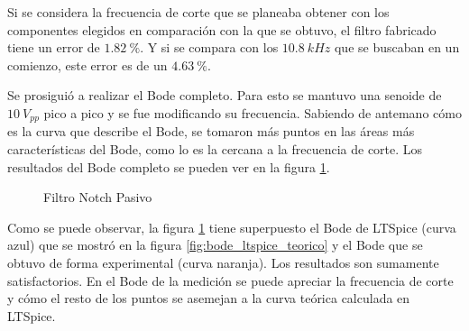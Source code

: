 Si se considera la frecuencia de corte que se planeaba obtener con los componentes elegidos en comparación con la que se obtuvo, el filtro fabricado tiene un error de $1.82 \ \%$. Y si se compara con los $10.8 \ kHz$ que se buscaban en un comienzo, este error es de un $4.63 \ \%$.

Se prosiguió a realizar el Bode completo. Para esto se mantuvo una senoide de $10 \ V_{pp}$ pico a pico
y se fue modificando su frecuencia. Sabiendo de antemano cómo es la curva que 
describe el Bode, se tomaron más puntos en las áreas más características del Bode, como lo es la cercana a la frecuencia de corte. Los resultados del Bode completo se pueden ver en la figura \ref{fig:superpuesto}.

\begin{figure}[H] 
\begin{center}
\caption{Filtro Notch Pasivo}
\label{fig:superpuesto}
\end{center}
\end{figure}


Como se puede observar, la figura \ref{fig:superpuesto} tiene superpuesto el Bode
de LTSpice (curva azul) que se mostró en la figura \ref{fig:bode_ltspice_teorico} y el Bode que se obtuvo de forma experimental (curva naranja). Los resultados son sumamente satisfactorios. En el Bode de la medición se puede apreciar la frecuencia de corte y cómo el resto de los puntos se asemejan a la curva teórica calculada en LTSpice. 


